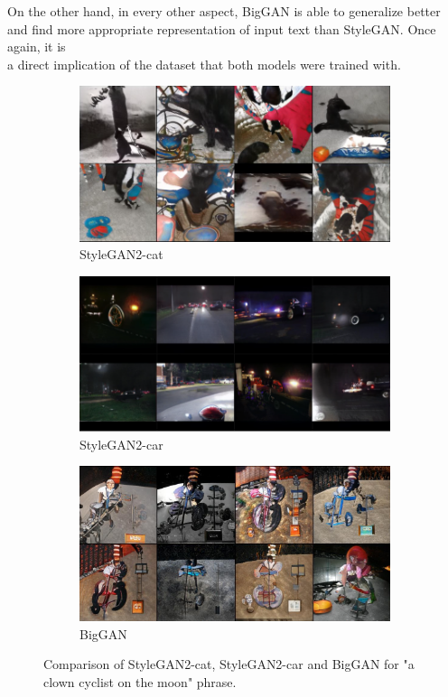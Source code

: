 \documentclass[11pt,a4paper,openany]{book}
\begin{document}
\noindent On the other hand, in every other aspect, BigGAN is able to generalize better and find more appropriate representation of input text than StyleGAN. Once again, it is \\a direct implication of the dataset that both models were trained with. 

\begin{figure}[H]
\centering
\begin{subfigure}[b]{1.0\textwidth}
\centering
   \includegraphics[width=0.7\linewidth]{clown_stylegancat2.PNG}
   \caption{StyleGAN2-cat}
   \label{fig:Ng1} 
\end{subfigure}

\begin{subfigure}[b]{1.0\textwidth}
\centering
   \includegraphics[width=0.7\linewidth]{clown_stylegancar.PNG}
   \caption{StyleGAN2-car}
   \label{fig:Ng2}
\end{subfigure}

\begin{subfigure}[b]{1.0\textwidth}
\centering
   \includegraphics[width=0.7\linewidth]{clown_biggan.PNG}
   \caption{BigGAN}
   \label{fig:Ng2}
\end{subfigure}

\caption[pics]{Comparison of StyleGAN2-cat, StyleGAN2-car and BigGAN for "a clown cyclist on the moon" phrase.}
\end{figure}
\end{document}

